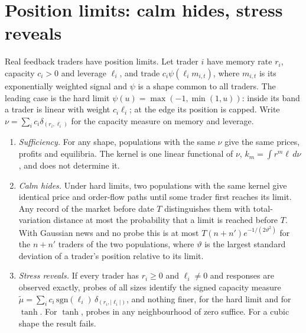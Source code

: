 \section{Position limits: calm hides, stress reveals}\label{n:sat}

Real feedback traders have position limits. Let trader $i$ have memory rate $r_i$, capacity $c_i>0$ and leverage $\ell_i$, and trade $c_i\psi(\ell_im_{i,t})$, where $m_{i,t}$ is its exponentially weighted signal and $\psi$ is a shape common to all traders. The leading case is the hard limit $\psi(u)=\max(-1,\min(1,u))$: inside its band a trader is linear with weight $c_i\ell_i$; at the edge its position is capped. Write $\nu=\sum_ic_i\delta_{(r_i,\ell_i)}$ for the capacity measure on memory and leverage.

\begin{theorem}\label{n:sat_thm}
\begin{enumerate}[label=(\roman*),itemsep=1pt]
\item \emph{Sufficiency.} For any shape, populations with the same $\nu$ give the same prices, profits and equilibria. The kernel is one linear functional of $\nu$, $k_m=\int r^m\ell\,d\nu$, and does not determine it.
\item \emph{Calm hides.} Under hard limits, two populations with the same kernel give identical price and order-flow paths until some trader first reaches its limit. Any record of the market before date $T$ distinguishes them with total-variation distance at most the probability that a limit is reached before $T$. With Gaussian news and no probe this is at most $T(n+n')e^{-1/(2\vartheta^2)}$ for the $n+n'$ traders of the two populations, where $\vartheta$ is the largest standard deviation of a trader's position relative to its limit.
\item \emph{Stress reveals.} If every trader has $r_i\ge0$ and $\ell_i\ne0$ and responses are observed exactly, probes of all sizes identify the signed capacity measure $\tilde\mu=\sum_ic_i\,\mathrm{sgn}(\ell_i)\,\delta_{(r_i,|\ell_i|)}$, and nothing finer, for the hard limit and for $\tanh$. For $\tanh$, probes in any neighbourhood of zero suffice. For a cubic shape the result fails.
\end{enumerate}
\end{theorem}


